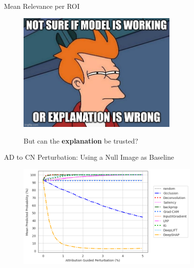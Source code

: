 \documentclass[aspectratio=169,xcolor={table, dvipsnames}]{beamer}
\renewcommand{\emph}[1]{\textbf{#1}}
\begin{document}
\begin{frame}{Mean Relevance per ROI}
	
\end{frame}
\begin{frame}[plain]
	\begin{center}
		\begin{figure}
			\href{https://knowyourmeme.com/memes/futurama-fry-not-sure-if}{
				\includegraphics[width=0.7\textwidth]{figures/fry-and-xai-2.png
				}}
			\caption*{But can the \emph{explanation} be trusted?}
		\end{figure}

	\end{center}
\end{frame}





\begin{frame}{AD to CN Perturbation: Using a Null Image as Baseline}
	\begin{figure}
		\centering
		\includegraphics[width=0.8\textwidth]{figures/3672-ad-fidelity-null.png}
	\end{figure}
\end{frame}
\end{document}
